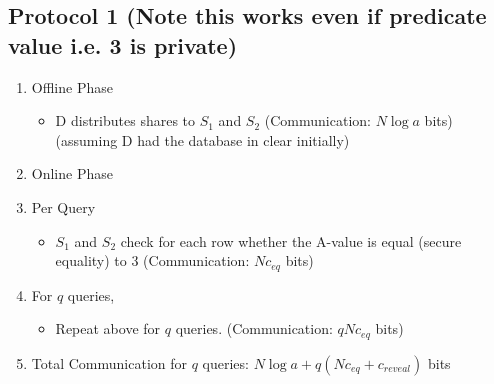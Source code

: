 \subsection{Protocol 1 (Note this works even if predicate value i.e. 3 is private)}
\begin{enumerate}
    \item Offline Phase
    \begin{itemize}
        \item D distributes shares to $S_1$ and $S_2$ (Communication: $N\log a$ bits) (assuming D had the database in clear initially)
    \end{itemize}
    \item Online Phase
    \item Per Query
    \begin{itemize}
        \item $S_1$ and $S_2$ check for each row whether the A-value is equal (secure equality) to 3 (Communication: $Nc_{eq}$ bits)
    \end{itemize}
    \item For $q$ queries,
    \begin{itemize}
        \item Repeat above for $q$ queries. (Communication: $qNc_{eq}$ bits)
    \end{itemize}
    \item Total Communication for $q$ queries: $N\log a + q(Nc_{eq} + c_{reveal})$ bits  
\end{enumerate}

